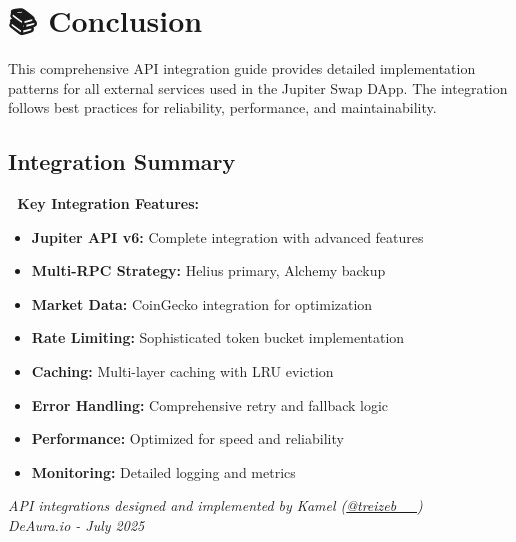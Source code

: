 \documentclass[11pt,a4paper]{article}
\begin{document}
\section{📚 Conclusion}

This comprehensive API integration guide provides detailed implementation patterns for all external services used in the Jupiter Swap DApp. The integration follows best practices for reliability, performance, and maintainability.

\subsection{Integration Summary}

\begin{tcolorbox}[colback=successGreen!10,colframe=successGreen]
\textbf{🎯 Key Integration Features:}
\begin{itemize}
    \item \textbf{Jupiter API v6:} Complete integration with advanced features
    \item \textbf{Multi-RPC Strategy:} Helius primary, Alchemy backup
    \item \textbf{Market Data:} CoinGecko integration for optimization
    \item \textbf{Rate Limiting:} Sophisticated token bucket implementation
    \item \textbf{Caching:} Multi-layer caching with LRU eviction
    \item \textbf{Error Handling:} Comprehensive retry and fallback logic
    \item \textbf{Performance:} Optimized for speed and reliability
    \item \textbf{Monitoring:} Detailed logging and metrics
\end{itemize}
\end{tcolorbox}

\vspace{1cm}

\begin{center}
\textit{API integrations designed and implemented by Kamel (\href{https://x.com/treizeb__}{@treizeb\_\_})\\
DeAura.io - July 2025}
\end{center}
\end{document}
